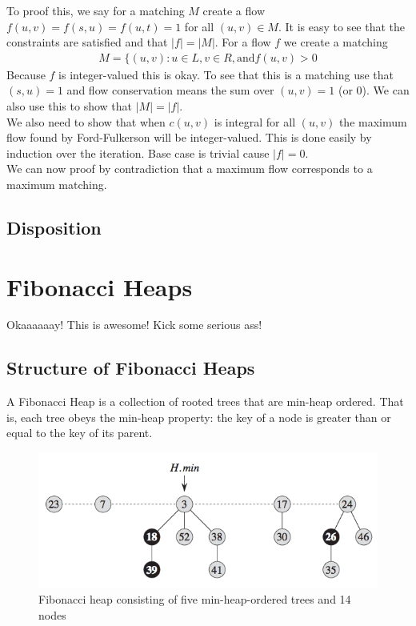 \documentclass[12pt]{article}
\begin{document}
To proof this, we say for a matching $M$ create a flow $f(u, v) = f(s, u) = f(u, t) = 1$ for all $(u, v) \in M$. It is easy to see that the constraints are satisfied and that $|f| = |M|$. For a flow $f$ we create a matching
\begin{align*}
	M = \{(u, v) : u \in L, v \in R, \text{and} f(u, v) > 0 
\end{align*}
Because $f$ is integer-valued this is okay. To see that this is a matching use that $(s, u) = 1$ and flow conservation means the sum over $(u, v) = 1$ (or $0$). We can also use this to show that $|M| = |f|$. \\

We also need to show that when $c(u, v)$ is integral for all $(u, v)$ the maximum flow found by Ford-Fulkerson will be integer-valued. This is done easily by induction over the iteration. Base case is trivial cause $|f| = 0$.\\

We can now proof by contradiction that a maximum flow corresponds to a maximum matching.

\subsection{Disposition}
\newpage

\section{Fibonacci Heaps}
Okaaaaaay! This is awesome! Kick some serious ass!

\subsection{Structure of Fibonacci Heaps}
A Fibonacci Heap is a collection of rooted trees that are min-heap ordered. That is, each tree obeys the min-heap property: the key of a node is greater than or equal to the key of its parent. 

\begin{figure} [H]
    \begin{center}
        \includegraphics[width=\textwidth]{Images/Hmin.png}
        \caption{Fibonacci heap consisting of five min-heap-ordered trees and 14 nodes}
        \label{fig:H.min}
    \end{center}
\end{figure}
\end{document}
